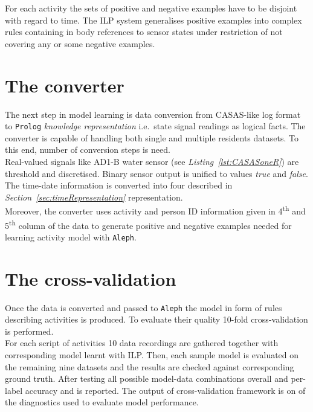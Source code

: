\documentclass[12pt, a4paper, pdflatex, leqno, twoside, openright]{report}
\newcommand{\ts}{\textsuperscript}
\begin{document}
For each activity the sets of positive and negative examples have to be disjoint with regard to time. The ILP system generalises positive examples into complex rules containing in body references to sensor states under restriction of not covering any or some negative examples.

  \section{The converter}
The next step in model learning is data conversion from CASAS-like log format to \texttt{Prolog} \emph{knowledge representation} i.e.\ state signal readings as logical facts. The converter is capable of handling both single and multiple residents datasets. To this end, number of conversion steps is need.\\

Real-valued signals like AD1-B water sensor (see \emph{Listing~\ref{lst:CASASoneR}}) are threshold and discretised. Binary sensor output is unified to values \emph{true} and \emph{false}. The time-date information is converted into four described in \emph{Section~\ref{sec:timeRepresentation}} representation.\\
Moreover, the converter uses activity and person ID information given in 4\ts{th} and 5\ts{th} column of the data to generate positive and negative examples needed for learning activity model with \texttt{Aleph}.

  \section{The cross-validation}
Once the data is converted and passed to \texttt{Aleph} the model in form of rules describing activities is produced. To evaluate their quality 10-fold cross-validation is performed.\\
For each script of activities 10 data recordings are gathered together with corresponding model learnt with ILP. Then, each sample model is evaluated on the remaining nine datasets and the results are checked against corresponding ground truth. After testing all possible model-data combinations overall and per-label accuracy and is reported. The output of cross-validation framework is on of the diagnostics used to evaluate model performance.

\end{document}
